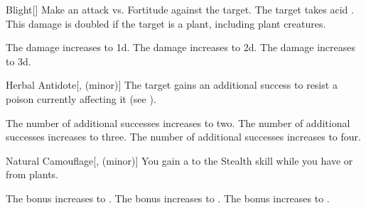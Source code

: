 \lowercase{\hypertarget{spell:Blight}{}}\label{spell:Blight}
\begin{freeability}[Rank 1]{\hypertarget{spell:Blight}{Blight}}[]
Make an attack vs. Fortitude against the target.
\hit The target takes acid .
This damage is doubled if the target is a plant, including plant creatures.

\rankline
{} The damage increases to  \plus1d.
 The damage increases to  \plus2d.
 The damage increases to  \plus3d.
\end{freeability}
\vspace{0.25em}



\lowercase{\hypertarget{spell:Herbal Antidote}{}}\label{spell:Herbal Antidote}
\begin{freeability}[Rank 1]{\hypertarget{spell:Herbal Antidote}{Herbal Antidote}}[,  (minor)]
The target gains an additional success to resist a poison currently affecting it (see ).

\rankline
{} The number of additional successes increases to two.
 The number of additional successes increases to three.
 The number of additional successes increases to four.
\end{freeability}
\vspace{0.25em}



\lowercase{\hypertarget{spell:Natural Camouflage}{}}\label{spell:Natural Camouflage}
\begin{freeability}[Rank 1]{\hypertarget{spell:Natural Camouflage}{Natural Camouflage}}[,  (minor)]
You gain a   to the Stealth skill while you have  or  from plants.

\rankline
{} The bonus increases to .
 The bonus increases to .
 The bonus increases to .
\end{freeability}
\vspace{0.25em}



